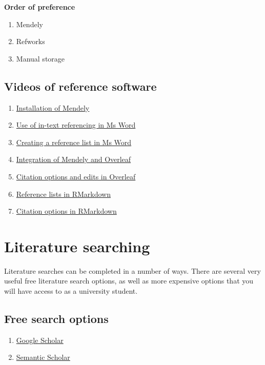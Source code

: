 \documentclass[
]{book}
\providecommand{\tightlist}{%
  \setlength{\itemsep}{0pt}\setlength{\parskip}{0pt}}
\begin{document}
\textbf{\textbf{Order of preference}}

\begin{enumerate}
\def\labelenumi{\arabic{enumi}.}
\item
  Mendely
\item
  Refworks
\item
  Manual storage
\end{enumerate}

\hypertarget{videos-of-reference-software}{%
\section{Videos of reference software}\label{videos-of-reference-software}}

\begin{enumerate}
\def\labelenumi{\arabic{enumi}.}
\item
  \href{}{Installation of Mendely}
\item
  \href{}{Use of in-text referencing in Ms Word}
\item
  \href{}{Creating a reference list in Ms Word}
\item
  \href{}{Integration of Mendely and Overleaf}
\item
  \href{}{Citation options and edits in Overleaf}
\item
  \href{}{Reference lists in RMarkdown}
\item
  \href{}{Citation options in RMarkdown}
\end{enumerate}

\hypertarget{literature-searching}{%
\chapter{Literature searching}\label{literature-searching}}

Literature searches can be completed in a number of ways. There are several very useful free literature search options, as well as more expensive options that you will have access to as a university student.

\hypertarget{free-search-options}{%
\section{Free search options}\label{free-search-options}}

\begin{enumerate}
\def\labelenumi{\arabic{enumi}.}
\tightlist
\item
  \href{https://scholar.google.com}{Google Scholar}
\item
  \href{https://www.semanticscholar.org}{Semantic Scholar}
\end{enumerate}
\end{document}
